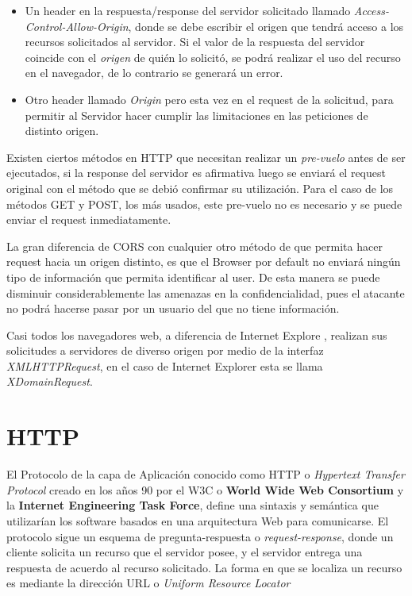     \begin{itemize}
        \item Un header en la respuesta/response del servidor solicitado llamado \textit{Access-Control-Allow-Origin}, donde se debe escribir el origen que tendrá acceso a los recursos solicitados al servidor. Si el valor de la respuesta del servidor coincide con el \textit{origen} de quién lo solicitó, se podrá realizar el uso del recurso en el navegador, de lo contrario se generará un error.
        \item Otro header llamado \textit{Origin} pero esta vez en el request de la solicitud, para permitir al Servidor hacer cumplir las limitaciones en las peticiones de distinto origen.
    \end{itemize}
    Existen ciertos métodos en HTTP que necesitan realizar un \textit{pre-vuelo} antes de ser ejecutados, si la response del servidor es afirmativa luego se enviará el request original con el método que se debió confirmar su utilización. Para el caso de los métodos GET y POST, los más usados, este pre-vuelo no es necesario y se puede enviar el request inmediatamente.
    
    La gran diferencia de CORS con cualquier otro método de que permita hacer request hacia un origen distinto, es que el Browser por default no enviará ningún tipo de información que permita identificar al user. De esta manera se puede disminuir considerablemente las amenazas en la confidencialidad, pues el atacante no podrá hacerse pasar por un usuario del que no tiene información.
    
    Casi todos los navegadores web, a diferencia de Internet Explore \cite{bookWebAppSec}, realizan sus solicitudes a servidores de  diverso origen por medio de la interfaz \textit{XMLHTTPRequest}, en el caso de Internet Explorer esta se llama \textit{XDomainRequest}.

\section{HTTP}
\label{chap:HTTP}
El Protocolo de la capa de Aplicación conocido como HTTP o \textit{Hypertext Transfer Protocol} creado en los años 90 por el W3C o \textbf{World Wide Web Consortium} y la \textbf{Internet Engineering Task Force}, define una sintaxis y semántica que utilizarían los software basados en una arquitectura Web para comunicarse. El protocolo sigue un esquema de pregunta-respuesta o \textit{request-response}, donde un cliente solicita un recurso que el servidor posee, y el servidor entrega una respuesta de acuerdo al recurso solicitado. La forma en que se localiza un recurso es mediante la dirección URL o \textit{Uniform Resource Locator}

